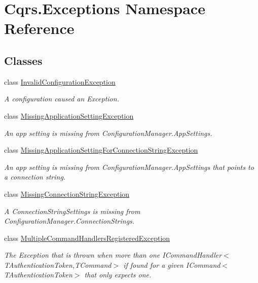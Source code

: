 \hypertarget{namespaceCqrs_1_1Exceptions}{}\section{Cqrs.\+Exceptions Namespace Reference}
\label{namespaceCqrs_1_1Exceptions}
\subsection*{Classes}
\begin{DoxyCompactItemize}
\item 
class \hyperlink{classCqrs_1_1Exceptions_1_1InvalidConfigurationException}{Invalid\+Configuration\+Exception}
\begin{DoxyCompactList}\small\item\em A configuration caused an Exception. \end{DoxyCompactList}\item 
class \hyperlink{classCqrs_1_1Exceptions_1_1MissingApplicationSettingException}{Missing\+Application\+Setting\+Exception}
\begin{DoxyCompactList}\small\item\em An app setting is missing from Configuration\+Manager.\+App\+Settings. \end{DoxyCompactList}\item 
class \hyperlink{classCqrs_1_1Exceptions_1_1MissingApplicationSettingForConnectionStringException}{Missing\+Application\+Setting\+For\+Connection\+String\+Exception}
\begin{DoxyCompactList}\small\item\em An app setting is missing from Configuration\+Manager.\+App\+Settings that points to a connection string. \end{DoxyCompactList}\item 
class \hyperlink{classCqrs_1_1Exceptions_1_1MissingConnectionStringException}{Missing\+Connection\+String\+Exception}
\begin{DoxyCompactList}\small\item\em A Connection\+String\+Settings is missing from Configuration\+Manager.\+Connection\+Strings. \end{DoxyCompactList}\item 
class \hyperlink{classCqrs_1_1Exceptions_1_1MultipleCommandHandlersRegisteredException}{Multiple\+Command\+Handlers\+Registered\+Exception}
\begin{DoxyCompactList}\small\item\em The Exception that is thrown when more than one I\+Command\+Handler$<$\+T\+Authentication\+Token,\+T\+Command$>$ if found for a given I\+Command$<$\+T\+Authentication\+Token$>$ that only expects one. \end{DoxyCompactList}\item 

\end{DoxyCompactItemize}
